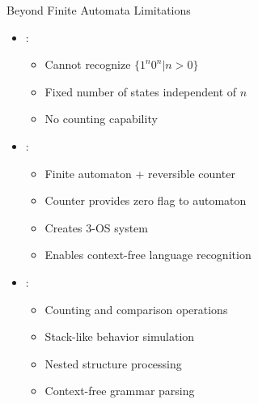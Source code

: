 \begin{frame}{Beyond Finite Automata Limitations}
\begin{itemize}
\item {}:
\begin{itemize}
\item Cannot recognize $\{1^n0^n | n > 0\}$
\item Fixed number of states independent of $n$
\item No counting capability
\end{itemize}
\vspace{0.5cm}
\item {}:
\begin{itemize}
\item Finite automaton + reversible counter
\item Counter provides zero flag to automaton
\item Creates 3-OS system
\item Enables context-free language recognition
\end{itemize}
\vspace{0.3cm}
\item {}:
\begin{itemize}
\item Counting and comparison operations
\item Stack-like behavior simulation
\item Nested structure processing
\item Context-free grammar parsing
\end{itemize}
\end{itemize}
\end{frame}

